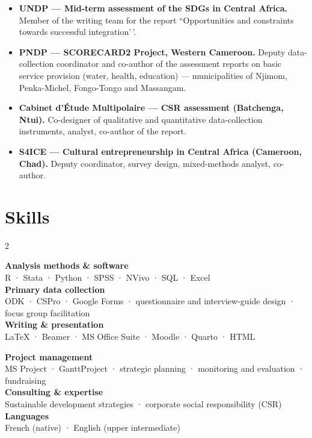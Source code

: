 \documentclass[
  french,
  10pt,
  letterpaper,
  DIV=11,
  numbers=noendperiod]{scrartcl}
\providecommand{\tightlist}{%
  \setlength{\itemsep}{0pt}\setlength{\parskip}{0pt}}
\begin{document}
\begin{itemize}
\tightlist
\item
  \textbf{UNDP --- Mid-term assessment of the SDGs in Central Africa.}
  Member of the writing team for the report ``Opportunities and
  constraints towards successful integration'\,'.
\item
  \textbf{PNDP --- SCORECARD2 Project, Western Cameroon.} Deputy
  data-collection coordinator and co-author of the assessment reports on
  basic service provision (water, health, education) --- municipalities
  of Njimom, Penka-Michel, Fongo-Tongo and Massangam.
\item
  \textbf{Cabinet d'Étude Multipolaire --- CSR assessment (Batchenga,
  Ntui).} Co-designer of qualitative and quantitative data-collection
  instruments, analyst, co-author of the report.
\item
  \textbf{S4ICE --- Cultural entrepreneurship in Central Africa
  (Cameroon, Chad).} Deputy coordinator, survey design, mixed-methods
  analyst, co-author.
\end{itemize}

\section{Skills}\label{skills}

\begin{paracol}{2}

\textbf{Analysis methods \& software}\\
R · Stata · Python · SPSS · NVivo · SQL · Excel\\

\textbf{Primary data collection}\\
ODK · CSPro · Google Forms · questionnaire and interview-guide design · focus group facilitation\\

\textbf{Writing \& presentation}\\
\LaTeX{} · Beamer · MS Office Suite · Moodle · Quarto · HTML

\switchcolumn

\textbf{Project management}\\
MS Project · GanttProject · strategic planning · monitoring and evaluation · fundraising\\

\textbf{Consulting \& expertise}\\
Sustainable development strategies · corporate social responsibility (CSR)\\

\textbf{Languages}\\
French (native) · English (upper intermediate)

\end{paracol}
\end{document}
